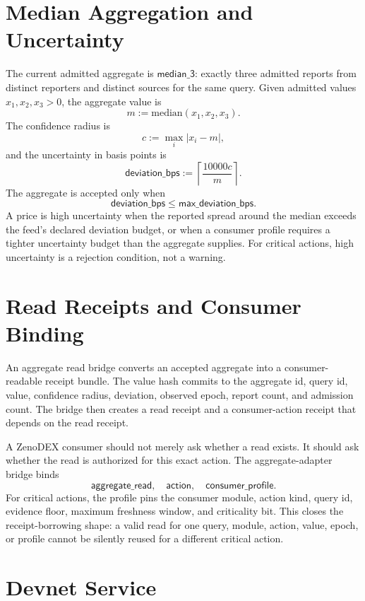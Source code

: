 \documentclass[11pt]{article}
\begin{document}
\section{Median Aggregation and Uncertainty}

The current admitted aggregate is \(\mathsf{median\_3}\): exactly three
admitted reports from distinct reporters and distinct sources for the same
query. Given admitted values \(x_1,x_2,x_3>0\), the aggregate value is
\[
  m := \mathrm{median}(x_1,x_2,x_3).
\]
The confidence radius is
\[
  c := \max_i |x_i - m|,
\]
and the uncertainty in basis points is
\[
  \mathsf{deviation\_bps} := \left\lceil \frac{10000c}{m} \right\rceil.
\]
The aggregate is accepted only when
\[
  \mathsf{deviation\_bps} \leq \mathsf{max\_deviation\_bps}.
\]
A price is high uncertainty when the reported spread around the median exceeds
the feed's declared deviation budget, or when a consumer profile requires a
tighter uncertainty budget than the aggregate supplies. For critical actions,
high uncertainty is a rejection condition, not a warning.

\section{Read Receipts and Consumer Binding}

An aggregate read bridge converts an accepted aggregate into a consumer-readable
receipt bundle. The value hash commits to the aggregate id, query id, value,
confidence radius, deviation, observed epoch, report count, and admission
count. The bridge then creates a read receipt and a consumer-action receipt
that depends on the read receipt.

A ZenoDEX consumer should not merely ask whether a read exists. It should ask
whether the read is authorized for this exact action. The aggregate-adapter
bridge binds
\[
  \mathsf{aggregate\_read},\quad \mathsf{action},\quad \mathsf{consumer\_profile}.
\]
For critical actions, the profile pins the consumer module, action kind, query
id, evidence floor, maximum freshness window, and criticality bit. This closes
the receipt-borrowing shape: a valid read for one query, module, action, value,
epoch, or profile cannot be silently reused for a different critical action.

\section{Devnet Service}
\end{document}
